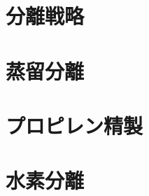 \documentclass[11pt,aspectratio=43,dvipsnames]{beamer}
\begin{document}
\setcounter{framenumber}{8}
\section{分離戦略}
\section{蒸留分離}
\section{プロピレン精製}
\section{水素分離}
\end{document}
